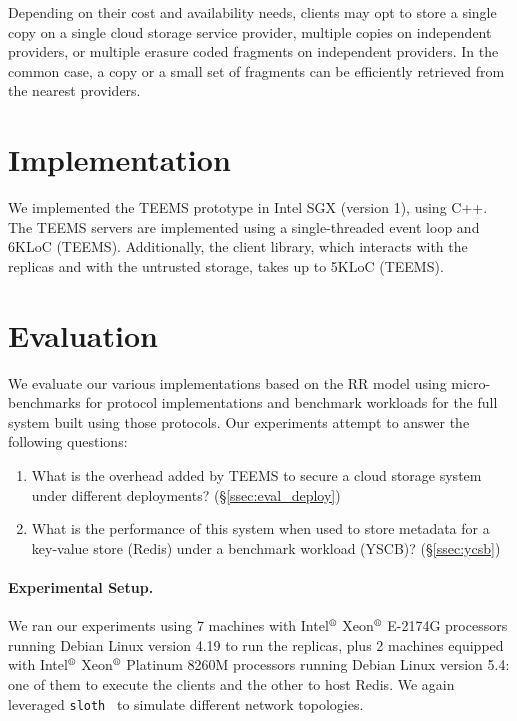 Depending on their cost and availability needs, clients may opt to
store a single copy on a single cloud storage service provider,
multiple copies on independent providers, or multiple erasure coded
fragments on independent providers. In the common case, a copy or a
small set of fragments can be efficiently retrieved from the nearest
providers.


\section{Implementation}\label{sec:teems_impl}

We implemented the \ac{TEEMS} prototype in Intel SGX (version 1),
using C++. The \ac{TEEMS} servers are implemented using a
single-threaded event loop and 6KLoC (\ac{TEEMS}). Additionally,
the client library, which interacts with the replicas and with
the untrusted storage, takes up to 5KLoC (\ac{TEEMS}).


\section{Evaluation}\label{sec:teems_eval}


We evaluate our various implementations based on the \ac{RR}
model using micro-benchmarks for protocol implementations and
benchmark workloads for the full system built using those
protocols. Our experiments attempt to answer the following
questions:

\begin{enumerate}
    \item What is the overhead added by \ac{TEEMS} to secure a cloud storage system under different
      deployments?  (\S\ref{ssec:eval_deploy})
    \item What is the performance of this system  when used to store
      metadata for a key-value store (Redis) under a benchmark
      workload (YSCB)?
      (\S\ref{ssec:ycsb})
\end{enumerate}

\paragraph{Experimental Setup.}
We ran our experiments using 7 machines  with
Intel$^\text{\textregistered}$ Xeon$^\text{\textregistered}$ E-2174G
processors running Debian Linux version 4.19 to run the replicas,
plus 2 machines equipped with Intel$^\text{\textregistered}$
Xeon$^\text{\textregistered}$ Platinum 8260M processors running Debian
Linux version 5.4: one of them to execute the clients and the other to
host Redis.
%
We again leveraged \texttt{sloth}~\cite{sloth} to simulate
different network topologies.

